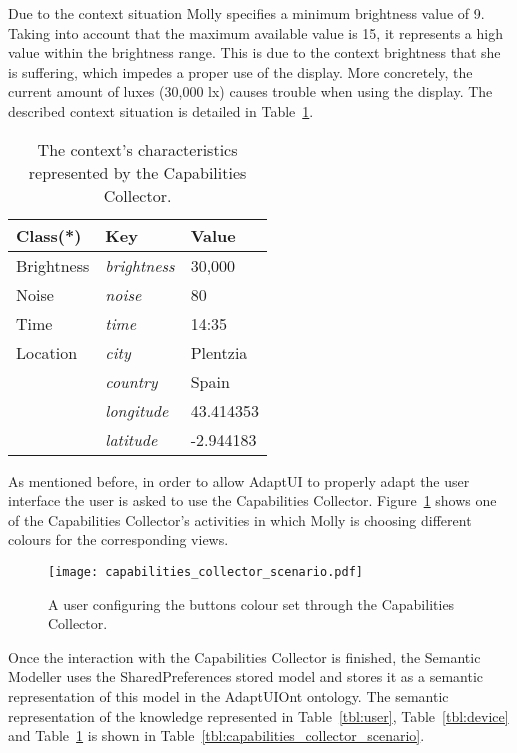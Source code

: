Due to the context situation Molly specifies a minimum brightness value of 9.
Taking into account that the maximum available value is 15, it represents a
high value within the brightness range. This is due to the context brightness 
that she is suffering, which impedes a proper use of the display. More concretely,
the current amount of luxes (30,000 \ac{lx}) causes trouble when using the
display. The described context situation is detailed in Table~\ref{tbl:context}.

\begin{table}
 \caption{The context's characteristics represented by the Capabilities Collector.}
 \label{tbl:context}
 \footnotesize
 \centering
\begin{tabular}{l l l}
  \hline 
  \textbf{Class(*)}& \textbf{Key} & \textbf{Value}		\\
  \hline
  Brightness	& \textit{brightness}		& 30,000	\\
  Noise		& \textit{noise}		& 80		\\
  Time		& \textit{time}			& 14:35	\\
  Location	& \textit{city}			& Plentzia	\\
		& \textit{country}		& Spain		\\
		& \textit{longitude}		& 43.414353	\\
		& \textit{latitude} 		& -2.944183	\\	
  \hline
\end{tabular}
\end{table}


As mentioned before, in order to allow AdaptUI to properly adapt the user 
interface the user is asked to use the Capabilities Collector. 
Figure~\ref{fig:capabilities_collector_scenario} shows one of the Capabilities
Collector's activities in which Molly is choosing different colours for the
corresponding views.

\begin{figure}
\centering
\texttt{[image: capabilities\_collector\_scenario.pdf]}
\caption{A user configuring the buttons colour set through the Capabilities Collector.}
\label{fig:capabilities_collector_scenario}
\end{figure}

Once the interaction with the Capabilities Collector is finished, the Semantic 
Modeller uses the SharedPreferences stored model and stores it as a semantic 
representation of this model in the AdaptUIOnt ontology. The semantic representation
of the knowledge represented in Table~\ref{tbl:user}, Table~\ref{tbl:device} and
Table~\ref{tbl:context} is shown in Table~\ref{tbl:capabilities_collector_scenario}.


